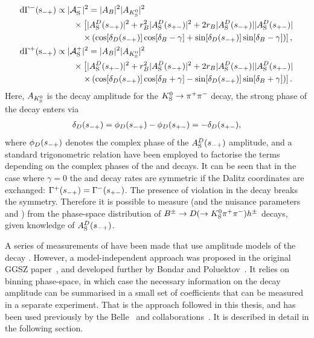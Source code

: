  \begin{subequations}\label{eq:Gamma_Bminus}
\begin{align} 
    \rm {d} \Gamma^-(s_{-+}) &\propto |\mathcal{A}_{\rm S}^-|^2 = |A_{B}|^2|A_{{{K}^0_{\mathrm{S}}}}|^2 \notag \\
    &\qquad\times\left[|A_{\rm S}^{D}(s_{-+})|^2 + r_{B}^2 |A_{\rm S}^{D}(s_{+-})|^2 + 2r_{B} |A_{\rm S}^{D}(s_{-+})||A_{\rm S}^{D}(s_{+-})|\right .
    \notag \\
    &\quad\qquad \left. \times \left(\cos[\delta_D(s_{-+})]\cos[\delta_{B}-\gamma]+\sin[\delta_D(s_{-+})]\sin[\delta_{B}-\gamma]\right)\right], \\
    \rm {d} \Gamma^+(s_{-+}) &\propto |\mathcal{A}_{\rm S}^+|^2 = |A_{B}|^2|A_{{{K}^0_{\mathrm{S}}}}|^2 \notag \\
    &\qquad\times\left[|A_{\rm S}^{D}(s_{+-})|^2 + r_{B}^2 |A_{\rm S}^{D}(s_{-+})|^2 + 2r_{B} |A_{\rm S}^{D}(s_{-+})||A_{\rm S}^{D}(s_{+-})|\right .
    \notag \\
    &\quad\qquad \left. \times \left(\cos[\delta_D(s_{-+})]\cos[\delta_{B}+\gamma]-\sin[\delta_D(s_{-+})]\sin[\delta_{B}+\gamma]\right)\right].
\end{align}
\end{subequations}
Here, $A_{{K}^0_{\mathrm{S}}}$ is the decay amplitude for the ${{K}^0_{\mathrm{S}}}\rightarrow{\ensuremath{{\pi}^+}}{\ensuremath{{\pi}^-}}$ decay, the strong phase of the \D decay enters via 
\begin{align}
    {\delta_\D(\smp) = \phi_D(\smp) - \phi_D(\spm) = - \delta_D(\spm)},
\end{align} where $\phi_D(s_{-+})$ denotes the complex phase of the $A_{\rm S}^{D}(s_{-+})$ amplitude, and a standard trigonometric relation have been employed to factorise the terms depending on the complex phases of the \B and \D decays. It can be seen that in the case where $\gamma=0$ the \Bp and \Bm decay rates are symmetric if the Dalitz coordinates are exchanged: $\Gamma^+(s_{-+})=\Gamma^-(s_{+-})$. The presence of \CP violation in the \B decay breaks the symmetry. Therefore it is possible to measure \g (and the nuisance parameters \rB and \dB) from the phase-space distribution of ${{B}^\pm}\rightarrow{\ensuremath{D}}(\rightarrow{\ensuremath{{K}^0_{\mathrm{S}}}} \pi^+ \pi^-)h^\pm$ decays, given knowledge of $A_{\rm S}^{D}(s_{-+})$.

A series of measurements of \g have been made that use amplitude models of the \D decay \cite{BABAR2005,BABAR2008,BABAR2010, BELLE2004,BELLE2006,BELLE2010,LHCb-PAPER-2014-017,LHCb-PAPER-2016-007}. However, 
a model-independent approach was proposed in the original GGSZ paper~\cite{giriDeterminingGammaUsing2003}, and developed further by Bondar and Poluektov~\cite{bondarFeasibilityStudyModelindependent2006,bondarUseQuantumcorrelatedD02008}. It relies on binning phase-space, in which case the necessary information on the \D decay amplitude can be summarised in a small set of coefficients that can be measured in a separate experiment. That is the approach followed in this thesis, and has been used previously by the Belle~\cite{BELLEMODIND} and \lhcb collaborations~\cite{LHCb-PAPER-2012-027,LHCb-PAPER-2014-041,LHCb-PAPER-2018-017}. It is described in detail in the following section.

